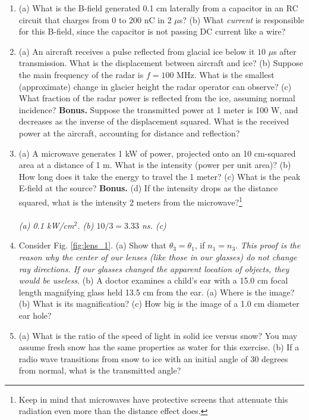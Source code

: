 \documentclass[12pt,twocolumn]{article}
\begin{document}
\noindent
\begin{enumerate}
\item (a) What is the B-field generated 0.1 cm laterally from a capacitor in an RC circuit that charges from 0 to 200 nC in 2 $\mu$s? (b) What \textit{current} is responsible for this B-field, since the capacitor is not passing DC current like a wire? \\ \vspace{1.5cm}
\item (a) An aircraft receives a pulse reflected from glacial ice below it $10$ $\mu$s after transmission. What is the displacement between aircraft and ice? (b) Suppose the main frequency of the radar is $f = 100$ MHz.  What is the smallest (approximate) change in glacier height the radar operator can observe? (c) What fraction of the radar power is reflected from the ice, assuming normal incidence? \textbf{Bonus.} Suppose the transmitted power at 1 meter is 100 W, and decreases as the inverse of the displacement squared.  What is the received power at the aircraft, accounting for distance and reflection? \\ \vspace{4cm}
\item (a) A microwave generates 1 kW of power, projected onto an 10 cm-squared area at a distance of 1 m.  What is the intensity (power per unit area)? (b) How long does it take the energy to travel the 1 meter? (c) What is the peak E-field at the source?  \textbf{Bonus.} (d) If the intensity drops as the distance squared, what is the intensity 2 meters from the microwave?\footnote{Keep in mind that microwaves have protective screens that attenuate this radiation even more than the distance effect does.} \\ \\
\textit{(a) 0.1 kW/cm$^2$. (b) $10/3 = 3.33$ ns. (c) }
\item Consider Fig. \ref{fig:lens_1}.  (a) Show that $\theta_3 = \theta_1$, if $n_1 = n_3$.  \textit{This proof is the reason why the center of our lenses (like those in our glasses) do not change ray directions.  If our glasses changed the apparent location of objects, they would be useless.} (b) A doctor examines a child's ear with a 15.0 cm focal length magnifying glass held 13.5 cm from the ear. (a) Where is the image? (b) What is its magnification? (c) How big is the image of a 1.0 cm diameter ear hole? \\ \vspace{3cm}
\item (a) What is the ratio of the speed of light in solid ice versus snow?  You may assume fresh snow has the same properties as water for this exercise. (b) If a radio wave transitions from snow to ice with an initial angle of 30 degrees from normal, what is the transmitted angle? \\ \vspace{3cm}

\end{enumerate}
\end{document}
